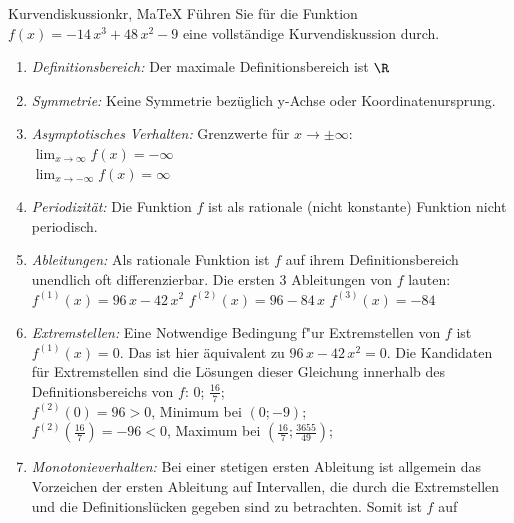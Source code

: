  \providecommand{\MoIl}{(} 
 \providecommand{\MoIr}{)}
 \providecommand{\MIntvlSep}{;} 
 \providecommand{\MElSetSep}{;} 
 \begin{MAufgabe}{Kurvendiskussion}{kr, MaTeX}
 F\"uhren Sie f\"ur die Funktion $f(x)= - 14\, x^3 + 48\, x^2 - 9$ eine vollst\"andige Kurvendiskussion durch.\\ 
 \ifLsg\Loesung
 \begin{enumerate}
 \item \emph{Definitionsbereich:} 
 Der maximale Definitionsbereich ist $\R$\item \emph{Symmetrie:} 
 Keine Symmetrie bez\"uglich y-Achse oder Koordinatenursprung.\item \emph{Asymptotisches Verhalten:} 
 Grenzwerte f\"ur $x\rightarrow \pm \infty$: \\ 
 $\lim_{x\rightarrow \infty} f(x)=- \infty$ \\ 
 $\lim_{x\rightarrow -\infty} f(x)=\infty$ \\ 
 \item \emph{Periodizit\"at:} 
 Die Funktion $f$ ist als rationale (nicht konstante) Funktion nicht periodisch.\item \emph{Ableitungen:} 
 Als rationale Funktion ist $f$ auf ihrem Definitionsbereich unendlich oft differenzierbar. 
 Die ersten 3 Ableitungen von $f$ lauten: \\ 
 $f^{(1)}(x)=96\, x - 42\, x^2$\newline 
  $f^{(2)}(x)=96 - 84\, x$\newline 
  $f^{(3)}(x)=-84$\newline 
  \item \emph{Extremstellen:} 
 Eine Notwendige Bedingung f"ur Extremstellen von $f$ ist $f^{(1)}(x)=0$. 
 Das ist hier \"aquivalent zu $96\, x - 42\, x^2=0$. 
 Die Kandidaten f\"ur Extremstellen sind die L\"osungen dieser Gleichung innerhalb des Definitionsbereichs von $f$: $0$; $\frac{16}{7}$; \\ 
 $f^{(2)}(0)=96$$>0$, Minimum bei $(0;-9)$; \\ 
 $f^{(2)}(\frac{16}{7})=-96$$<0$, Maximum bei $(\frac{16}{7};\frac{3655}{49})$; \\ 
 \item \emph{Monotonieverhalten:} 
 Bei einer stetigen ersten Ableitung ist allgemein das Vorzeichen der ersten Ableitung auf Intervallen, die durch die Extremstellen und die Definitionsl\"ucken gegeben sind zu betrachten. Somit ist $f$ auf \\ 

\end{enumerate}
\end{MAufgabe}
